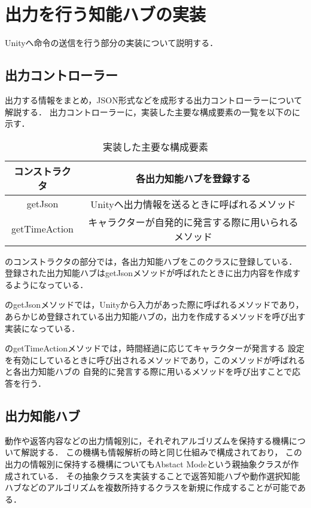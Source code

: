
\section{出力を行う知能ハブの実装}
Unityへ命令の送信を行う部分の実装について説明する．

\subsection{出力コントローラー}
出力する情報をまとめ，JSON形式などを成形する出力コントローラーについて解説する．
出力コントローラーに，実装した主要な構成要素の一覧を以下のに示す．

\begin{table}[tbh]
	\caption{実装した主要な構成要素} \label{tab:OutputController}
	\begin{center}
		\begin{tabular}[htb]{c|c}
		\hline
		コンストラクタ & 各出力知能ハブを登録する \\
		\hline
		getJson & Unityへ出力情報を送るときに呼ばれるメソッド \\
		\hline
		getTimeAction & キャラクターが自発的に発言する際に用いられるメソッド \\
		\hline
		\end{tabular}
	\end{center}
\end{table}

のコンストラクタの部分では，各出力知能ハブをこのクラスに登録している．
登録された出力知能ハブはgetJsonメソッドが呼ばれたときに出力内容を作成するようになっている．

のgetJsonメソッドでは，Unityから入力があった際に呼ばれるメソッドであり，
あらかじめ登録されている出力知能ハブの，出力を作成するメソッドを呼び出す実装になっている．

のgetTimeActionメソッドでは，時間経過に応じてキャラクターが発言する
設定を有効にしているときに呼び出されるメソッドであり，このメソッドが呼ばれると各出力知能ハブの
自発的に発言する際に用いるメソッドを呼び出すことで応答を行う．

\subsection{出力知能ハブ}
動作や返答内容などの出力情報別に，それぞれアルゴリズムを保持する機構について解説する．
この機構も情報解析の時と同じ仕組みで構成されており，
この出力の情報別に保持する機構についてもAbstact Modeという親抽象クラスが作成されている．
その抽象クラスを実装することで返答知能ハブや動作選択知能ハブなどのアルゴリズムを複数所持するクラスを新規に作成することが可能である．

